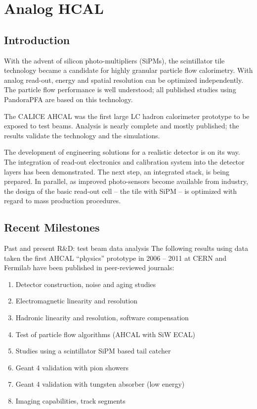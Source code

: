 \section{Analog HCAL}
\subsection{Introduction}
With the advent of silicon photo-multipliers (SiPMs), the scintillator tile technology became a candidate for highly granular particle flow calorimetry. With analog read-out, energy and spatial resolution can be optimized independently. The particle flow performance is well understood; all published studies using  PandoraPFA are based on this technology.

The CALICE AHCAL was the first large LC hadron calorimeter prototype to be exposed to test beams. Analysis is nearly complete and mostly published; the results validate the technology and the simulations.

The development of engineering solutions for a realistic detector is on its way. The integration of read-out electronics and calibration system into the detector layers has been demonstrated. The next step, an integrated stack, is being prepared. In parallel, as improved photo-sensors become available from industry, the design of the basic read-out cell -- the tile with SiPM -- is optimized with regard to mass production procedures.

\subsection{Recent Milestones}
Past and present R\&D: test beam data analysis
The following results using data taken the first AHCAL ``physics'' prototype in 2006 -- 2011 at CERN and Fermilab have been published in peer-reviewed journals:
\begin{enumerate}
\item Detector construction, noise and aging studies~\cite{1748-0221-5-05-P05004}
\item Electromagnetic linearity and resolution~\cite{1748-0221-6-04-P04003}
\item Hadronic linearity and resolution, software compensation~\cite{1748-0221-7-09-P09017}
\item Test of particle flow algorithms (AHCAL with SiW ECAL)~\cite{1748-0221-6-07-P07005}
\item Studies using a scintillator SiPM based tail catcher~\cite{1748-0221-7-04-P04015}
\item Geant 4 validation with pion showers~\cite{1748-0221-8-07-P07005}
\item Geant 4 validation with tungsten absorber (low energy)~\cite{1748-0221-9-01-P01004}
\item Imaging capabilities, track segments~\cite{1748-0221-8-09-P09001}
\end{enumerate}

